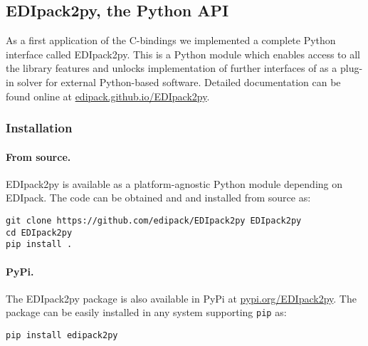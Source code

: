 \documentclass[edipack_sp.tex]{subfiles}
\begin{document}




\subsection{EDIpack2py, the Python API}\label{sSecInteropEDIpy}
As a first application of the \NAME C-bindings we implemented a
complete Python interface called EDIpack2py. This is a Python module which
enables access to all the library features and unlocks implementation of
further interfaces of \NAME as a plug-in solver for external Python-based software. Detailed documentation can be found online at \href{https://edipack.github.io/EDIpack2py}
{edipack.github.io/EDIpack2py}.


\subsubsection{Installation}\label{sSecInteropEDIpyInstallation}
\paragraph{From source.}
EDIpack2py is available as a platform-agnostic Python module depending on EDIpack.
The code can be obtained and and installed from source as:
\begin{lstlisting}[style=mybash]
git clone https://github.com/edipack/EDIpack2py EDIpack2py
cd EDIpack2py
pip install . 
\end{lstlisting}

\paragraph{PyPi.}
The EDIpack2py package is also available in PyPi at
\href{https://pypi.org/project/EDIpack2py/}{pypi.org/EDIpack2py}. The package can be easily installed in any system supporting {\tt pip} as:

\begin{lstlisting}[style=mybash]
pip install edipack2py
\end{lstlisting}

\end{document}
